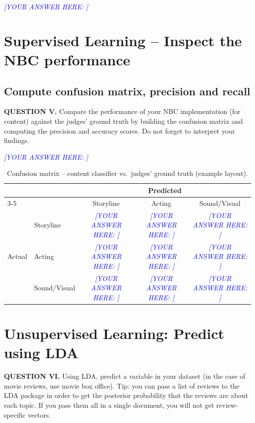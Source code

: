 \documentclass[11pt]{article}
\newcommand{\question}[2]{%
  \par\medskip
  \noindent\textbf{QUESTION #1.} #2\par\medskip
}
\newcommand{\answer}[1]{%
  \textcolor{blue}{\emph{[YOUR ANSWER HERE: #1]}}
}
\begin{document}
\answer{}


\section{Supervised Learning -- Inspect the NBC performance}
\subsection{Compute confusion matrix, precision and recall}
\question{V}{Compare the performance of your NBC implementation (for content)
against the judges' ground truth by building the confusion matrix and computing the
precision and accuracy scores. Do not forget to interpret your findings.}

\answer{}

\begin{table}[H]
  \centering
  \caption{Confusion matrix -- content classifier vs.\ judges' ground truth (example layout).}
  \label{tab:confusion-matrix}
  \footnotesize
  \begin{tabular}{llccc}
    \toprule
    & & \multicolumn{3}{c}{Predicted} \\
    \cmidrule(lr){3-5}
    & & Storyline & Acting & Sound/Visual \\
    \midrule
    \multirow{3}{*}{Actual} & Storyline     & \answer{} & \answer{} & \answer{} \\
                            & Acting        & \answer{} & \answer{} & \answer{} \\
                            & Sound/Visual  & \answer{} & \answer{} & \answer{} \\
    \bottomrule
  \end{tabular}
\end{table}

\section{Unsupervised Learning: Predict using LDA}
\question{VI}{Using LDA, predict a variable in your dataset (in the case of movie reviews, use movie box office). Tip: you can pass a list of
reviews to the LDA package in order to get the posterior probability that the
reviews are about each topic. If you pass them all in a single document, you will
not get review-specific vectors.}
\end{document}
